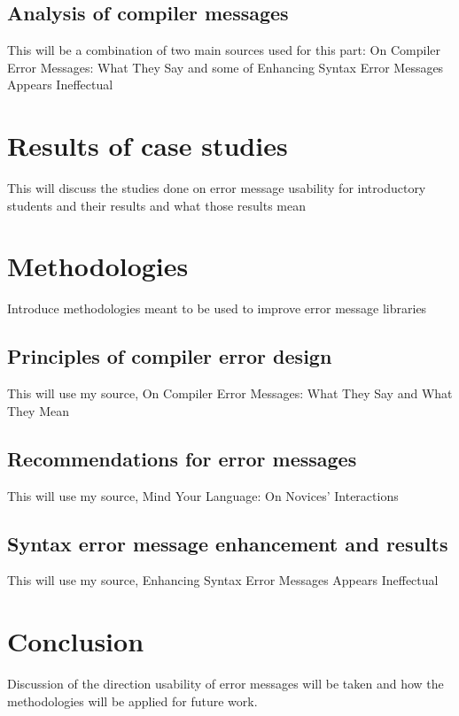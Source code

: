 \documentclass{sig-alternate}
\begin{document}
\subsection{Analysis of compiler messages}
This will be a combination of two main sources used for this part: On Compiler Error Messages: What They Say and some of Enhancing Syntax Error Messages Appears Ineffectual


\section{Results of case studies}\label{results}
This will discuss the studies done on error message usability for introductory students and their results and what those results mean



\section{Methodologies}
Introduce methodologies meant to be used to improve error message libraries


\subsection{Principles of compiler error design}
This will use my source, On Compiler Error Messages: What They Say and What They Mean

\subsection{Recommendations for error messages}
This will use my source, Mind Your Language: On Novices' Interactions 

\subsection{Syntax error message enhancement and results}
This will use my source, Enhancing Syntax Error Messages Appears Ineffectual


\section{Conclusion}
Discussion of the direction usability of error messages will be taken and how the methodologies will be applied for future work.

\end{document}
